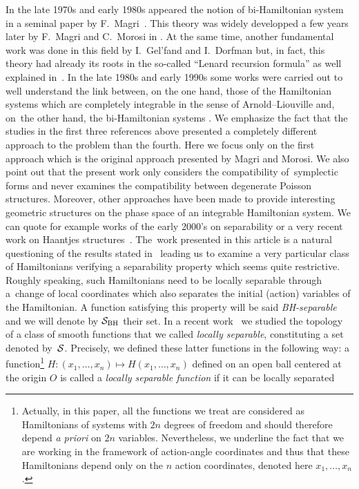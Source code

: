 \documentclass[10pt,a4paper]{amsart}
\numberwithin{equation}{section}
\begin{document}
In the late 1970s and early 1980s appeared the notion of bi-Hamiltonian system in a seminal paper by F.~Magri~\cite{Mag}. This theory was widely developped a few years later by F.~Magri and C.~Morosi in \cite{MaMo}. At the same time, another fundamental work was done in this field by I.~Gel'fand and I.~Dorfman \cite{GD} but, in fact, this theory had already its roots in the so-called ``Lenard recursion formula'' as well explained in~\cite{PS}. In the late 1980s and early 1990s some works were carried out to well understand the link between, on the one hand, those of the Hamiltonian systems which are completely integrable in the sense of Arnold--Liouville and, on~the other hand, the bi-Hamiltonian systems \cite{Br, BrMoTu,Fe, Mar}. We emphasize the fact that the studies in the first three references above presented a completely different approach to the problem than the fourth. Here we focus only on the first approach which is the original approach presented by Magri and Morosi. We also point out that the present work only considers the compatibility of~symplectic forms and never examines the compatibility between degenerate Poisson structures. Moreover, other approaches have been made to provide interesting geometric structures on the phase space of an integrable Hamiltonian system. We can quote for example works of the early 2000's on separability \cite{FP,IMM} or a very recent work on Haantjes structures~\cite{TT}. The~work presented in this article is a natural questioning of the results stated in~\cite{Br, BrMoTu,Fe} leading us to examine a very particular class of Hamiltonians verifying a separability property which seems quite restrictive. Roughly speaking, such Hamiltonians need to be locally separable through a~change of local coordinates which also separates the initial (action) variables of the Hamiltonian. A function satisfying this property will be said {\it BH-separable} and we will denote by ${\cal S}_{\rm BH}$ their set. In a recent work~\cite{BouBr} we studied the topology of a class of smooth functions that we called {\it locally separable}, constituting a set denoted by~${\cal S}$. Precisely, we defined these latter functions in the following way:
a function\footnote{Actually, in this paper, all the functions we treat are considered as Hamiltonians of systems with $2n$ degrees of freedom and should therefore depend {\it a priori} on $2n$ variables. Nevertheless, we underline the fact that we are working in the framework of action-angle coordinates and thus that these Hamiltonians depend only on the $n$ action coordinates, denoted here $x_1,\dots,x_n$.} $H\colon (x_1,\dots,x_n)\mapsto H(x_1,\dots,x_n)$ defined on an open ball centered at the origin $O$ is called a {\it locally separable function} if it can be locally separated
\end{document}
